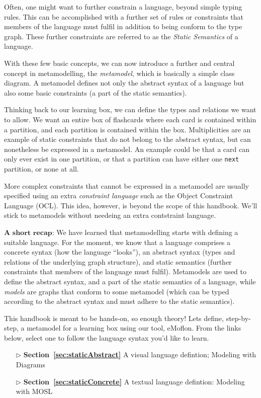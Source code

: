 Often, one might want to further constrain a language, beyond simple typing rules.
This can be accomplished with a further set of rules or constraints that members of the language must fulfil in addition to being conform to the type graph.
These further constraints are referred to as the \emph{Static Semantics} of a language.

With these few basic concepts, we can now introduce a further and central concept in metamodelling, the \emph{metamodel}, which is basically a simple class diagram. 
A metamodel defines not only the abstract syntax of a language but also some basic constraints (a part of the static semantics).

Thinking back to our learning box, we can define the types and relations we want to allow. We want an entire box of flashcards where each card is contained within a partition, and each partition is contained within the box. Multiplicities are an example of static constraints that do not belong to the abstract syntax, but can nonetheless be expressed in a metamodel.
An example could be that a card can only ever exist in one partition, or that a partition can have either one \texttt{next} partition, or none at all.

\pagebreak
More complex constraints that cannot be expressed in a metamodel are usually specified using an extra \emph{constraint language} such as the Object Constraint Language (OCL). This idea, however,  is beyond the scope of this handbook. We'll stick to metamodels without needeing an extra contstraint language. 

$\textbf{A short recap:}$  
We have learned that metamodelling starts with defining a suitable language.
For the moment, we know that a language comprises a concrete syntax (how the language ``looks''),  an abstract syntax (types and relations of the underlying graph structure), and static semantics (further constraints that members of the language must fulfil).
Metamodels are used to define the abstract syntax, and a part of the static semantics of a language, while \emph{models} are graphs that conform to some
metamodel (which can be typed according to the abstract syntax and must adhere to the static semantics).

This handbook is meant to be hands-on, so enough theory!
Lets define, step-by-step, a metamodel for a learning box using our tool, eMoflon. From the links below, select one to follow the language syntax you'd like to learn.

\vspace{1cm}

\begin{itemize}
  \item[$\triangleright$] {\bf Section~\ref{sec:staticAbstract}} A visual language defintion; Modeling with Diagrams
  \item[$\triangleright$] {\bf Section~\ref{sec:staticConcrete}} A textual language defintion: Modeling with MOSL
\end{itemize}